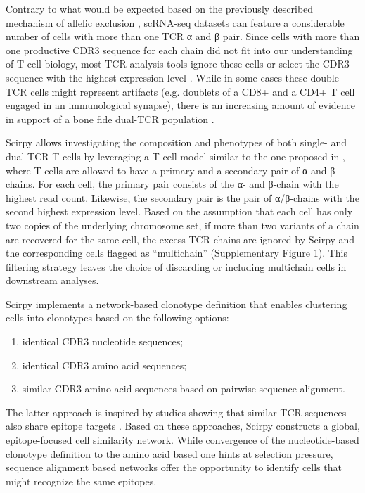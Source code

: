 \documentclass{article}
\begin{document}
Contrary to what would be expected based on the previously described mechanism of allelic exclusion \cite{Brady2010-gh}, scRNA-seq datasets can feature a considerable number of cells with more than one TCR α and β pair. Since cells with more than one productive CDR3 sequence for each chain did not fit into our understanding of T cell biology, most TCR analysis tools ignore these cells \cite{Fischer_undated-cx, Zhang2018-ip} or select the CDR3 sequence with the highest expression level \cite{Afik2017-sg}. While in some cases these double-TCR cells might represent artifacts (e.g. doublets of a CD8+ and a CD4+ T cell engaged in an immunological synapse), there is an increasing amount of evidence in support of a bone fide dual-TCR population \cite{Schuldt2019-ey, Ji2010-bn}. \par

Scirpy allows investigating the composition and phenotypes of both single- and dual-TCR T cells by leveraging a T cell model similar to the one proposed in \cite{Stubbington2016-kh}, where T cells are allowed to have a primary and a secondary pair of α and β chains. For each cell, the primary pair consists of the α- and β-chain with the highest read count. Likewise, the secondary pair is the pair of α/β-chains with the second highest expression level. Based on the assumption that each cell has only two copies of the underlying chromosome set, if more than two variants of a chain are recovered for the same cell, the excess TCR chains are ignored by Scirpy and the corresponding cells flagged as “multichain” (Supplementary Figure 1). This filtering strategy leaves the choice of discarding or including multichain cells in downstream analyses.\par

Scirpy implements a network-based clonotype definition that enables clustering cells into clonotypes based on the following options:
\begin{enumerate}[label=(\alph*)]
    \item identical CDR3 nucleotide sequences;
    \item identical CDR3 amino acid sequences;
    \item similar CDR3 amino acid sequences based on pairwise sequence alignment. 
\end{enumerate}

The latter approach is inspired by studies showing that similar TCR sequences also share epitope targets \cite{Glanville2017-ay, Dash2017-xt, Fischer_undated-cx}. Based on these approaches, Scirpy constructs a global, epitope-focused cell similarity network. While convergence of the nucleotide-based clonotype definition to the amino acid based one hints at selection pressure, sequence alignment based networks offer the opportunity to identify cells that might recognize the same epitopes.\par

\newpage

\printbibliography[title={Supplementary References}]
\end{document}
